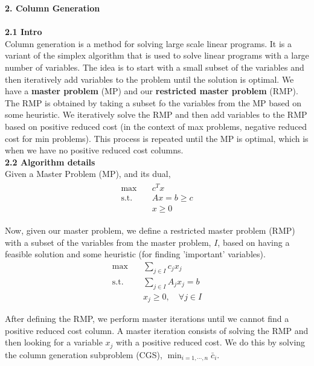 \documentclass[11pt]{article}
\begin{document}
\newpage


\noindent \textbf{\large{2. Column Generation}} \\
\\

\noindent \textbf{2.1 Intro}
\\

\noindent Column generation is a method for solving large scale linear programs. It is a variant of the simplex algorithm that is used to solve linear programs with a large number of variables. The idea is to start with a small subset of the variables and then iteratively add variables to the problem until the solution is optimal. We have a \textbf{master problem} (MP) and our \textbf{restricted master problem} (RMP). The RMP is obtained by taking a subset fo the variables from the MP based on some heuristic. We iteratively solve the RMP and then add variables to the RMP based on positive reduced cost (in the context of max problems, negative reduced cost for min problems). This process is repeated until the MP is optimal, which is when we have no positive reduced cost columns.
\\

\noindent \textbf{2.2 Algorithm details}
\\

\noindent Given a Master Problem (MP), and its dual, 
$$
\begin{aligned}
    \begin{aligned}
        \text{max} \quad & c^T x \\
        \text{s.t.} \quad & A x = b \geq c \\
        & x \geq 0 
    \end{aligned}
\end{aligned}
$$

\noindent Now, given our master problem, we define a restricted master problem (RMP) with a subset of the variables from the master problem, $I$, based on having a feasible solution and some heuristic (for finding 'important' variables). 
$$
\begin{aligned}
    \text{max} \quad & \sum_{j \in I} c_j x_j \\
    \text{s.t.} \quad & \sum_{j \in I} A_j x_j = b \\
    & x_j \geq 0, \quad \forall j \in I
\end{aligned}
$$
 

\noindent After defining the RMP, we perform master iterations until we cannot find a positive reduced cost column. A master iteration consists of solving the RMP and then looking for a variable $x_j$ with a positive reduced cost. We do this by solving the column generation subproblem (CGS), $\min_{i =1,\cdots,n} \bar{c}_i $.
\\
\end{document}
